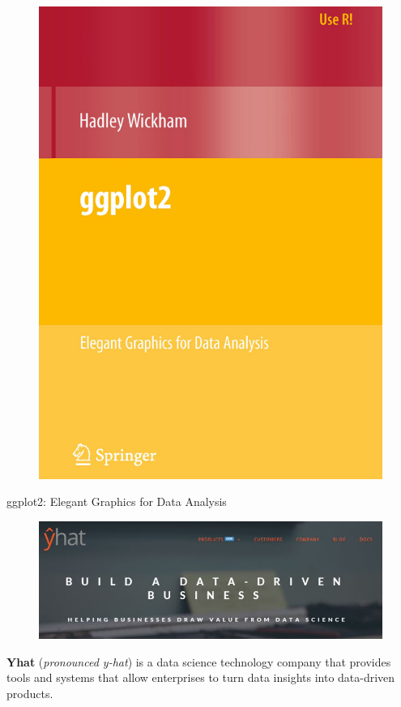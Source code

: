 \documentclass{beamer}
\begin{document}
\begin{frame}
\begin{figure}
\centering
\includegraphics[width=0.55\linewidth]{ggplot2-bookcover}
\end{figure}
ggplot2: Elegant Graphics for Data Analysis
\end{frame}


\begin{frame}
	
\begin{figure}
\centering
\includegraphics[width=0.8\linewidth]{yhat}
\end{figure}
\Large
\textbf{Yhat} (\textit{pronounced y-hat}) is a data science technology company that provides tools and systems that allow enterprises to turn data insights into data-driven products.\\ \bigskip


\end{frame}
\end{document}

